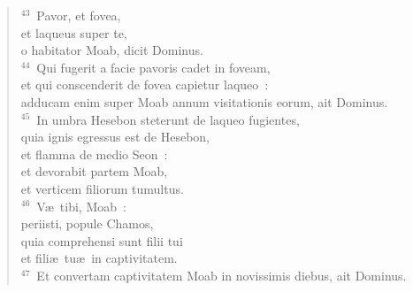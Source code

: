 \begin{flushleft}
\begin{verse}
${}^{43}$~Pavor, et fovea,\\ et laqueus super te,\\ o habitator Moab, dicit Dominus.\\
${}^{44}$~Qui fugerit a facie pavoris cadet in foveam,\\ et qui conscenderit de fovea capietur laqueo~:\\ adducam enim super Moab annum visitationis eorum, ait Dominus.\\
${}^{45}$~In umbra Hesebon steterunt de laqueo fugientes,\\ quia ignis egressus est de Hesebon,\\ et flamma de medio Seon~:\\ et devorabit partem Moab,\\ et verticem filiorum tumultus.\\
${}^{46}$~V\ae\ tibi, Moab~:\\ periisti, popule Chamos,\\ quia comprehensi sunt filii tui\\ et fili\ae\ tu\ae\ in captivitatem.\\
${}^{47}$~Et convertam captivitatem Moab in novissimis diebus, ait Dominus.\end{verse}\end{flushleft}

